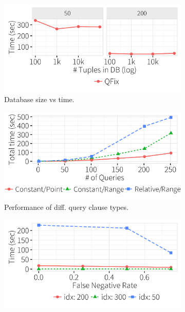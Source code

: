   \begin{figure}[h]
    \hspace*{-.1in}
    \centering
     \begin{subfigure}[t]{.33\textwidth}
      \includegraphics[width = .99\columnwidth]{figures/dbsize_time}
      \vspace*{-.25in}
      \caption{Database size vs time.}
      \label{f:dbsize_time} 
    \end{subfigure}
    \begin{subfigure}[t]{.33\textwidth}
      \includegraphics[width = .99\columnwidth]{figures/pointrelv_time}
      \vspace*{-.25in}
      \caption{Performance of diff. query clause types.}
      \label{f:qidx_time} 
    \end{subfigure}
    \begin{subfigure}[t]{.33\textwidth}
      \includegraphics[width = .99\columnwidth]{figures/noise_fn_time}

\end{subfigure}
\end{figure}
